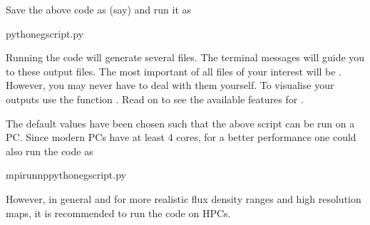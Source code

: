 \documentclass[letterpaper,10pt,english]{sphinxmanual}
\begin{document}
\begin{sphinxVerbatim}[commandchars=\\\{\}]
   

  



\end{sphinxVerbatim}

\sphinxAtStartPar
Save the above code as (say)  and run it as

\begin{sphinxVerbatim}[commandchars=\\\{\}]
pythoneg\PYGZus{}script.py
\end{sphinxVerbatim}

\sphinxAtStartPar
Running the code will generate several files. The terminal messages will
guide you to these output files. The most important of all files of your
interest will be . However, you may never have to deal
with them yourself. To visualise your outputs use the function
. Read on to see the available features for .

\sphinxAtStartPar
The default values have been chosen such that the above script can be
run on a PC. Since modern PCs have at least 4 cores, for a better
performance one could also run the code as

\begin{sphinxVerbatim}[commandchars=\\\{\}]
mpirun\PYGZhy{}nppythoneg\PYGZus{}script.py
\end{sphinxVerbatim}

\sphinxAtStartPar
However, in general and for more realistic flux density ranges and high
resolution maps, it is recommended to run the code on HPCs.
\end{document}
